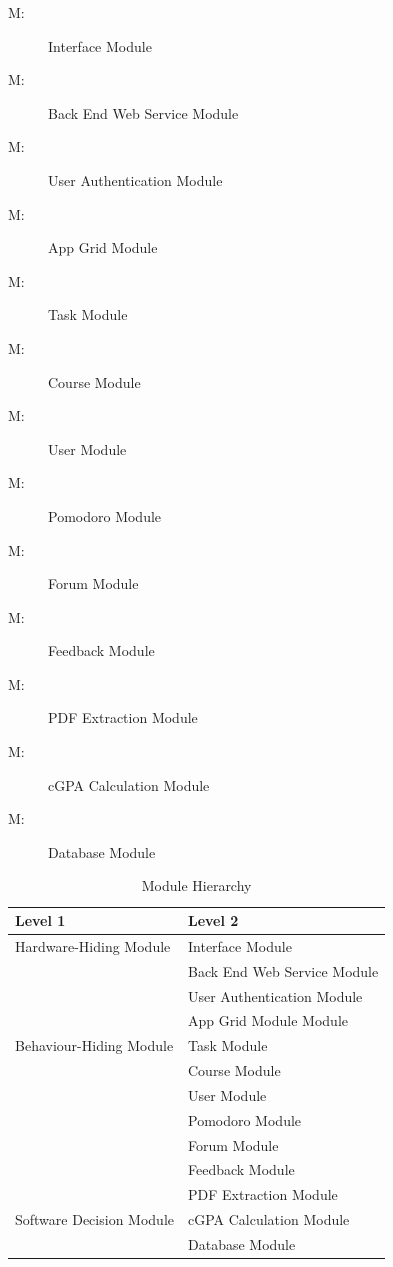 \documentclass[12pt, titlepage]{article}
\newcounter{mnum}
\newcommand{\mthemnum}{M\themnum}
\begin{document}
\begin{description}
\item [ \mthemnum \label{mIM}:] Interface Module
\item [ \mthemnum \label{mBEWS}:] Back End Web Service Module
\item [ \mthemnum \label{mUserAM}:] User Authentication Module
\item [ \mthemnum \label{mAGM}:] App Grid Module
\item [ \mthemnum \label{mTaskAM}:] Task Module
\item [ \mthemnum \label{mCM}:] Course Module
\item [ \mthemnum \label{mUM}:] User Module
\item [ \mthemnum \label{mPM}:] Pomodoro Module
\item [ \mthemnum \label{mFM}:] Forum Module
\item [ \mthemnum \label{mFBM}:] Feedback Module
\item [ \mthemnum \label{mPEM}:] PDF Extraction Module
\item [ \mthemnum \label{mCCM}:] cGPA Calculation Module
\item [ \mthemnum \label{mDTM}:] Database Module
\end{description}


\begin{table}[h!]
\centering
\begin{tabular}{p{} p{}}
\toprule
\textbf{Level 1} & \textbf{Level 2}\\
\midrule

{Hardware-Hiding Module} & Interface Module\\
\midrule

\multirow{7}{0.3\textwidth}{Behaviour-Hiding Module}
& Back End Web Service Module\\
& User Authentication Module\\ 
& App Grid Module Module\\ 
& Task Module\\
& Course Module\\
& User Module\\
& Pomodoro Module\\
& Forum Module\\
& Feedback Module\\
\midrule

\multirow{3}{0.3\textwidth}{Software Decision Module}
& PDF Extraction Module \\
& cGPA Calculation Module \\
& Database Module\\

\bottomrule

\end{tabular}
\caption{Module Hierarchy}
\label{TblMH}
\end{table}
\end{document}
